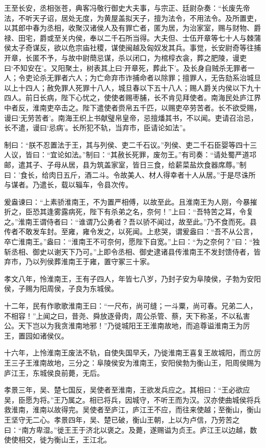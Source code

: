 \documentclass[]{article}
\begin{document}
王至长安，丞相张苍，典客冯敬行御史大夫事，与宗正、廷尉杂奏：``长废先帝法，不听天子诏，居处无度，为黄屋盖拟天子，擅为法令，不用法令。及所置吏，以其郎中春为丞相，收聚汉诸侯人及有罪亡者，匿为居，为治家室，赐与财物、爵禄、田宅，爵或至关内侯，奉以二千石所当得。大夫但、士伍开章等七十人与棘蒲侯太子奇谋反，欲以危宗庙社稷，谋使闽越及匈奴发其兵。事觉，长安尉奇等往捕开章，长匿不予，与故中尉蕳忌谋，杀以闭口，为棺椁衣衾，葬之肥陵，谩吏曰`不知安在'。又阳聚土，树表其上曰`开章死，葬此下'。及长身自贼杀无罪者一人；令吏论杀无罪者六人；为亡命弃市诈捕命者以除罪；擅罪人，无告劾系治城旦以上十四人；赦免罪人死罪十八人，城旦春以下五十八人；赐人爵关内侯以下九十四人。前日长病，陛下心忧之，使使者赐枣脯，长不肯见拜使者。南海民处庐江界中者反，淮南吏卒击之。陛下遣使者赍帛五千匹，以赐吏卒劳苦者。长不欲受赐，谩曰`无劳苦者'。南海王织上书献璧帛皇帝，忌擅燔其书，不以闻。吏请召治忌，长不遣，谩曰`忌病'。长所犯不轨，当弃市，臣请论如法''。

制曰：``朕不忍置法于王，其与列侯、吏二千石议。''列侯、吏二千石臣婴等四十三人议，皆曰：``宜论如法。''制曰：``其赦长死罪，废勿王。''有司奏：``请处蜀严道邛邮，遣其子、子母从居，县为筑盖家室，皆日三食，给薪菜盐炊食器席蓐。''制曰：'食长，给肉日五斤，酒二斗。令故美人、材人得幸者十人从居。''于是尽诛所与谋者。乃遣长，载以辎车，令县次传。

爰盎谏曰：``上素骄淮南王，不为置严相傅，以故至此。且淮南王为人刚，今暴摧折之，臣恐其逢雾露病死，陛下有杀弟之名，奈何！''上曰：``吾特苦之耳，令复之。''淮南王谓侍者曰：``谁谓乃公勇者？吾以骄不闻过，故至此。''乃不食而死。县传者不敢发车封。至雍，雍令发之，以死闻。上悲哭，谓爰盎曰：``吾不从公言，卒亡淮南王。''盎曰：``淮南王不可奈何，愿陛下自宽。''上曰：``为之奈何？''曰：``独斩丞相、御史以谢天下乃可。''上即令丞相、御史逮诸县传淮南王不发封馈侍者，皆弃市，乃以列侯葬淮南王于雍，置守冢三十家。

孝文八年，怜淮南王，王有子四人，年皆七八岁，乃封子安为阜陵侯，子勃为安阳侯，子赐为阳周侯，子良为东城侯。

十二年，民有作歌歌淮南王曰：``一尺布，尚可缝；一斗粟，尚可春。兄弟二人，不相容！''上闻之曰，昔尧、舜放逐骨肉，周公杀管、蔡，天下称圣，不以私害公。天下岂以为我贪淮南地邪！''乃徙城阳王王淮南故地，而追尊谥淮南王为厉王，置园如诸侯仪。

十六年，上怜淮南王废法不轨，自使失国早夭，乃徙淮南王喜复王故城阳，而立厉王三子王淮南故地，三分之：阜陵侯安为淮南王，安阳侯勃为衡山王，阳周侯赐为庐江王，东城侯良前薨，无后。

孝景三年，吴、楚七国反，吴使者至淮南，王欲发兵应之。其相曰：``王必欲应吴，臣愿为将。''王乃属之。相已将兵，因城守，不听王而为汉。汉亦使曲城侯将兵救淮南，淮南以故得完。吴使者至庐江，庐江王不应，而往来使越；至衡山，衡山王坚守无二心。孝景四年，吴、楚已破，衡山王朝，上以为卢信，乃劳苦之曰：``南方卑湿。''徙王王于济北以褒之。及薨，遂赐谥为贞王。庐江王以边越，数使使相交，徙为衡山王，王江北。
\end{document}
